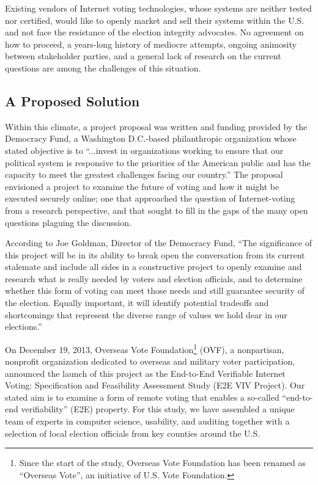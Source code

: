 Existing vendors of Internet voting technologies, whose systems are
neither tested nor certified, would like to openly market and sell
their systems within the U.S. and not face the resistance of the
election integrity advocates. No agreement on how to proceed, a
years-long history of mediocre attempts, ongoing animosity between
stakeholder parties, and a general lack of research on the current
questions are among the challenges of this situation.

\subsection{A Proposed Solution}
\label{sec:proposed-solution}

Within this climate, a project proposal was written and funding
provided by the Democracy Fund, a Washington D.C.-based philanthropic
organization whose stated objective is to “...invest in organizations
working to ensure that our political system is responsive to the
priorities of the American public and has the capacity to meet the
greatest challenges facing our country.” The proposal envisioned a
project to examine the future of voting and how it might be executed
securely online; one that approached the question of Internet-voting
from a research perspective, and that sought to fill in the gaps of
the many open questions plaguing the discussion.

According to Joe Goldman, Director of the Democracy Fund, “The
significance of this project will be in its ability to break open the
conversation from its current stalemate and include all sides in a
constructive project to openly examine and research what is really
needed by voters and election officials, and to determine whether this
form of voting can meet those needs and still guarantee security of
the election. Equally important, it will identify potential tradeoffs
and shortcomings that represent the diverse range of values we hold
dear in our elections.”

On December 19, 2013, Overseas Vote Foundation\footnote{Since the
  start of the study, Overseas Vote Foundation has been renamed as
  “Overseas Vote”, an initiative of U.S. Vote Foundation.} (OVF), a
nonpartisan, nonprofit organization dedicated to overseas and military
voter participation, announced the launch of this project as the
End-to-End Verifiable Internet Voting: Specification and Feasibility
Assessment Study (E2E VIV Project). Our stated aim is to examine a
form of remote voting that enables a so-called “end-to-end
verifiability” (E2E) property. For this study, we have assembled a
unique team of experts in computer science, usability, and auditing
together with a selection of local election officials from key
counties around the U.S.

